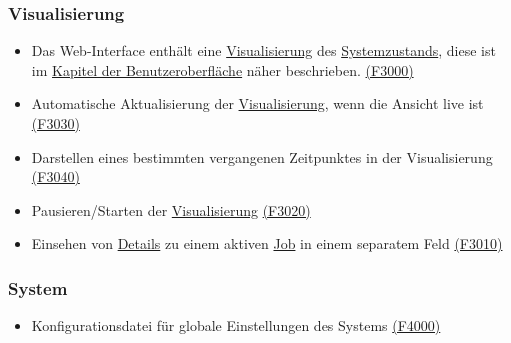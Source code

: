     \subsubsection{Visualisierung}    
        \begin{itemize}[noitemsep]
            \item Das \gls{Web-Interface} enthält eine \hyperref[pages:visualization]{Visualisierung} des \hyperref[B:Systemzustand]{Systemzustands}, diese ist im \hyperref[vis:appearance]{Kapitel der Benutzeroberfläche} näher beschrieben. \hyperref[FA:Visualisierung:Anzeigen des Systemzustandes]{(F3000)}
                
            \item Automatische Aktualisierung der \hyperref[pages:visualization]{Visualisierung}, wenn die Ansicht live ist \hyperref[FA:Visualisierung:Starten der Visualisierung]{(F3030)}
            \item Darstellen eines bestimmten vergangenen Zeitpunktes in der Visualisierung \hyperref[FA:Visualisierung:Springen]{(F3040)}
            \item Pausieren/Starten der \hyperref[pages:visualization]{Visualisierung} \hyperref[FA:Visualisierung:Pausieren der Visualisierung]{(F3020)}
            \item Einsehen von \hyperref[B:Job-Details]{Details} zu einem aktiven \hyperref[B:Jobs]{Job} in einem separatem Feld \hyperref[FA:Visualisierung:Anzeigen von Details]{(F3010)}
        \end{itemize}
    
    \subsubsection{System}
        \begin{itemize}[noitemsep]
            \item \gls{Konfigurationsdatei} für globale Einstellungen des Systems \hyperref[FA:System:Einstellungen festlegen]{(F4000)}
        \end{itemize}
        
